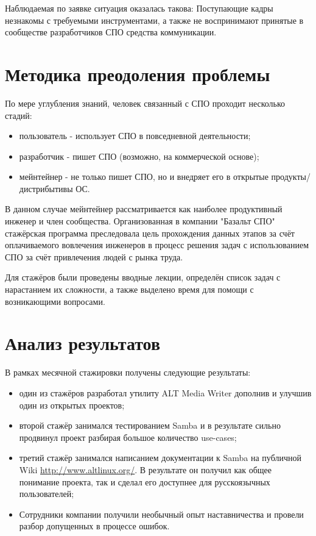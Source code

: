 Наблюдаемая по заявке ситуация оказалась такова: Поступающие кадры
незнакомы с требуемыми инструментами, а также не воспринимают принятые
в сообществе разработчиков СПО средства коммуникации.

\section{Методика преодоления проблемы}

По мере углубления знаний, человек связанный с СПО проходит несколько
стадий:

\begin{itemize}
\item пользователь - использует СПО в повседневной деятельности;
\item разработчик - пишет СПО (возможно, на коммерческой основе);
\item мейнтейнер - не только пишет СПО, но и внедряет его в открытые
продукты/дистрибытивы ОС.
\end{itemize}

В данном случае мейнтейнер рассматривается как наиболее продуктивный
инженер и член сообщества. Организованная в компании "Базальт СПО"
стажёрская программа преследовала цель прохождения данных этапов за
счёт оплачиваемого вовлечения инженеров в процесс решения задач с
использованием СПО за счёт привлечения людей с рынка труда.

Для стажёров были проведены вводные лекции, определён список задач с
нарастанием их сложности, а также выделено время для помощи с
возникающими вопросами.


\section{Анализ результатов}

В рамках месячной стажировки получены следующие результаты:

\begin{itemize}
\item один из стажёров разработал утилиту ALT Media Writer дополнив и
улучшив один из открытых проектов;
\item второй стажёр занимался тестированием Samba и в результате сильно
продвинул проект разбирая большое количество use-cases;
\item третий стажёр занимался написанием документации к Samba на публичной
Wiki \url{http://www.altlinux.org/}. В результате он получил как
общее понимание проекта, так и сделал его доступнее для русскоязычных 
пользователей;
\item Сотрудники компании получили необычный опыт наставничества и
провели разбор допущенных в процессе ошибок.
\end{itemize}

